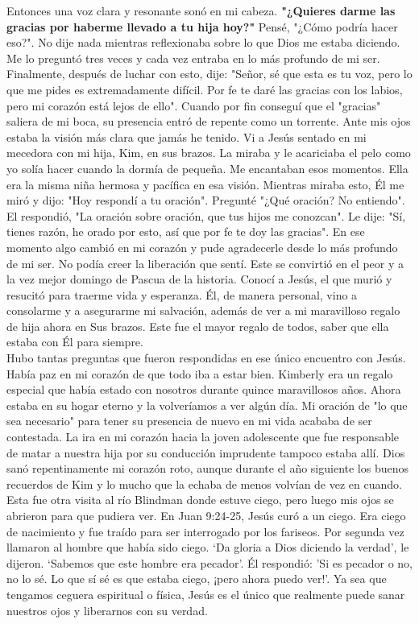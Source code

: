 \documentclass[twoside, 12pt]{book}
\begin{document}
Entonces una voz clara y resonante sonó en mi cabeza. \textbf{"¿Quieres darme las gracias por haberme llevado a tu hija hoy?"} Pensé, "¿Cómo podría hacer eso?". No dije nada mientras reflexionaba sobre lo que Dios me estaba diciendo. Me lo preguntó tres veces y cada vez entraba en lo más profundo de mi ser. Finalmente, después de luchar con esto, dije: "Señor, sé que esta es tu voz, pero lo que me pides es extremadamente difícil. Por fe te daré las gracias con los labios, pero mi corazón está lejos de ello". Cuando por fin conseguí que el "gracias" saliera de mi boca, su presencia entró de repente como un torrente. Ante mis ojos estaba la visión más clara que jamás he tenido. Vi a Jesús sentado en mi mecedora con mi hija, Kim, en sus brazos. La miraba y le acariciaba el pelo como yo solía hacer cuando la dormía de pequeña. Me encantaban esos momentos. Ella era la misma niña hermosa y pacífica en esa visión. Mientras miraba esto, Él me miró y dijo: "Hoy respondí a tu oración". Pregunté "¿Qué oración? No entiendo". El respondió, "La oración sobre oración, que tus hijos me conozcan". Le dije: "Sí, tienes razón, he orado por esto, así que por fe te doy las gracias". En ese momento algo cambió en mi corazón y pude agradecerle desde lo más profundo de mi ser. No podía creer la liberación que sentí. Este se convirtió en el peor y a la vez mejor domingo de Pascua de la historia. Conocí a Jesús, el que murió y resucitó para traerme vida y esperanza. Él, de manera personal, vino a consolarme y a asegurarme mi salvación, además de ver a mi maravilloso regalo de hija ahora en Sus brazos. Este fue el mayor regalo de todos, saber que ella estaba con Él para siempre.\\

Hubo tantas preguntas que fueron respondidas en ese único encuentro con Jesús. Había paz en mi corazón de que todo iba a estar bien. Kimberly era un regalo especial que había estado con nosotros durante quince maravillosos años. Ahora estaba en su hogar eterno y la volveríamos a ver algún día. Mi oración de "lo que sea necesario" para tener su presencia de nuevo en mi vida acababa de ser contestada. La ira en mi corazón hacia la joven adolescente que fue responsable de matar a nuestra hija por su conducción imprudente tampoco estaba allí. Dios sanó repentinamente mi corazón roto, aunque durante el año siguiente los buenos recuerdos de Kim y lo mucho que la echaba de menos volvían de vez en cuando. Esta fue otra visita al río Blindman donde estuve ciego, pero luego mis ojos se abrieron para que pudiera ver. En Juan 9:24-25, Jesús curó a un ciego. Era ciego de nacimiento y fue traído para ser interrogado por los fariseos. Por segunda vez llamaron al hombre que había sido ciego. ‘Da gloria a Dios diciendo la verdad’, le dijeron. ‘Sabemos que este hombre era pecador’. Él respondió: 'Si es pecador o no, no lo sé. Lo que sí sé es que estaba ciego, ¡pero ahora puedo ver!'. Ya sea que tengamos ceguera espiritual o física, Jesús es el único que realmente puede sanar nuestros ojos y liberarnos con su verdad.\\
\end{document}
